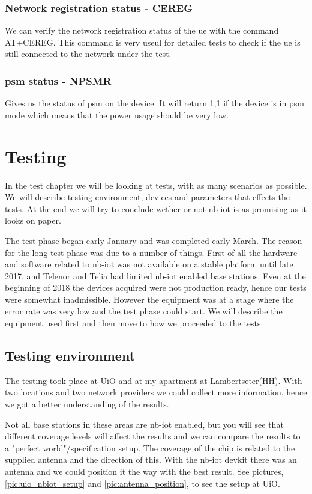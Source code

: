 \documentclass[USenglish]{ifimaster}  %
\begin{document}
\subsection{Network registration status - CEREG}
We can verify the network registration status of the \acrshort{ue} with the command AT+CEREG. This command is very useul for detailed tests to check if the \acrshort{ue} is still connected to the network under the test.

\subsection{\acrshort{psm} status - NPSMR}
Gives us the status of \acrshort{psm} on the device. It will return 1,1 if the device is in \acrshort{psm} mode which means that the power usage should be very low.

\chapter{Testing} \label{section:testing}
In the test chapter we will be looking at tests, with as many scenarios as possible. We will describe testing environment, devices and parameters that effects the tests. At the end we will try to conclude wether or not \acrshort{nb-iot} is as promising as it looks on paper.

The test phase began early January and was completed early March. The reason for the long test phase was due to a number of things. First of all the hardware and software related to \acrshort{nb-iot} was not available on a stable platform until late 2017, and Telenor and Telia had limited \acrshort{nb-iot} enabled base stations. Even at the beginning of 2018 the devices acquired were not production ready, hence our tests were somewhat inadmissible. However the equipment was at a stage where the error rate was very low and the test phase could start. We will describe the equipment used first and then move to how we proceeded to the tests.

\section{Testing environment}
The testing took place at UiO and at my apartment at Lambertseter(HH). With two locations and two network providers we could collect more information, hence we got a better understanding of the results.

Not all base stations in these areas are \acrshort{nb-iot} enabled, but you will see that different coverage levels will affect the results and we can compare the results to a "perfect world"/specification setup. The coverage of the chip is related to the supplied antenna and the direction of this. With the \acrshort{nb-iot} devkit there was an antenna and we could position it the way with the best result. See pictures, \vref{pic:uio_nbiot_setup} and \vref{pic:antenna_position}, to see the setup at UiO.
\end{document}
